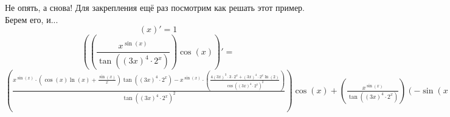 \documentclass[a4paper,12pt]{article} %
\begin{document}
 \newline 
Не опять, а снова! Для закрепления ещё раз посмотрим как решать этот пример. Берем его, и...\newline $$ \left( x \right)' = 1$$
 \newline{} $$
 \left( \left( \frac{  x^{ \sin \left( x\right)}}{ \tan \left(  \left(  3 x\right)^{ 4}\cdot   2^{ x}\right)}\right) \cos \left( x\right) \right)'= $$ \newline $  \left( \frac{     x^{ \sin \left( x\right)}\cdot \left(   \cos \left( x\right) \ln \left( x\right)+ \frac{ \sin \left( x\right)}{ x}\right) \tan \left(  \left(  3 x\right)^{ 4}\cdot   2^{ x}\right)-   x^{ \sin \left( x\right)}\cdot \left( \frac{     4 \left(  3 x\right)^{ 3}\cdot  3\cdot   2^{ x}+  \left(  3 x\right)^{ 4}\cdot    2^{ x} \ln \left( 2\right)}{  \cos \left(  \left(  3 x\right)^{ 4}\cdot   2^{ x}\right)^{ 2}}\right)}{  \tan \left(  \left(  3 x\right)^{ 4}\cdot   2^{ x}\right)^{ 2}}\right) \cos \left( x\right)+ \left( \frac{  x^{ \sin \left( x\right)}}{ \tan \left(  \left(  3 x\right)^{ 4}\cdot   2^{ x}\right)}\right)\left( - \sin \left( x\right)\right)$
\end{document}
